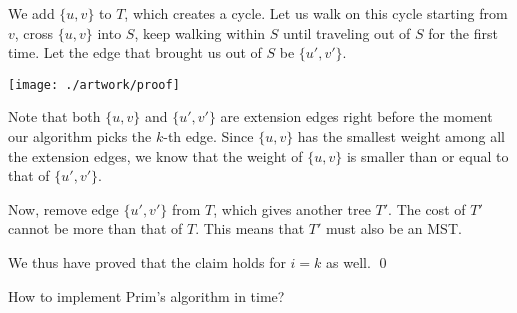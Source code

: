 \documentclass{beamer}
\def\vgap{\vspace{5mm}}
\begin{document}
\begin{frame}
\begin{small} 
    
    We add $\{u, v\}$ to $T$, which creates a cycle. Let us walk on this cycle starting from $v$, cross $\{u, v\}$ into $S$, keep walking within $S$ until traveling out of $S$ for the first time. Let the edge that brought us out of $S$ be $\{u', v'\}$. 
    
    \begin{center}
        \texttt{[image: ./artwork/proof]}
    \end{center}

    Note that both $\{u, v\}$ and $\{u',v'\}$ are extension edges right before the moment our algorithm picks the $k$-th edge. Since $\{u, v\}$ has the smallest weight among all the extension edges, we know that the weight of $\{u,v\}$ is smaller than or equal to that of $\{u',v'\}$. 
    
\end{small}     
\end{frame}
\begin{frame}
\begin{small} 
    
    \vgap
    
    Now, remove edge $\{u', v'\}$ from $T$, which gives another tree $T'$. The cost of $T'$ cannot be more than that of $T$. This means that $T'$ must also be an MST. 
    
    \vgap 
    
    We thus have proved that the claim holds for $i = k$ as well. \qed
    
\end{small}     
\end{frame}
\begin{frame}
\begin{small} 
    
    \vgap
    
     How to implement Prim's algorithm in  time?

\end{small}     
\end{frame}
\end{document}
